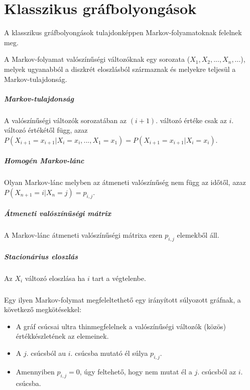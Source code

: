 \chapter{Klasszikus gráfbolyongások}

A klasszikus gráfbolyongások tulajdonképpen Markov-folyamatoknak felelnek meg.

A Markov-folyamat valószínűségi változóknak egy sorozata ($X_1, X_2, ..., X_n,
  ...$), melyek ugyanabból a diszkrét eloszlásból származnak és melyekre teljesül
a Markov-tulajdonság.

\paragraph{Markov-tulajdonság} A valószínűségi változók sorozatában az $(i+1).$
változó értéke csak az $i.$ változó értékétől függ, azaz $P(X_{i+1} = x_{i+1} |
  X_i = x_i, ..., X_1 = x_1) = P(X_{i+1} = x_{i+1} | X_i = x_i)$.

\paragraph{Homogén Markov-lánc} Olyan Markov-lánc melyben az átmeneti
valószínűség nem függ az időtől, azaz $P(X_{n+1} = i | X_n = j) = p_{i,j}$.

\paragraph{Átmeneti valószínűségi mátrix} A Markov-lánc átmeneti valószínűségi
mátrixa ezen $p_{i,j}$ elemekből áll.

\paragraph{Stacionárius eloszlás} Az $X_i$ változó eloszlása ha $i$ tart a
végtelenbe.

\paragraph{}

Egy ilyen Markov-folymat megfeleltethető egy irányított súlyozott gráfnak,
a következő megkötésekkel:

\begin{itemize}
  \item A gráf csúcsai ultra thinmegfelelnek a valószínűségi változók (közös)
        értékkészletének az elemeinek.
  \item A $j.$ csúcsból au $i.$ csúcsba mutató él súlya $p_{i,j}$.
  \item Amennyiben $p_{i,j}=0$, úgy feltehető, hogy nem mutat él a $j.$
        csúcsból az $i.$ csúcsba.
\end{itemize}

